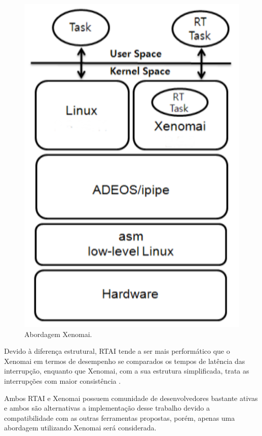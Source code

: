 \documentclass[conference]{IEEEtran}
\begin{document}
\begin{figure}[h]
	\centering
	\includegraphics[scale=0.22]{files/xenomai.png}
	\caption{Abordagem Xenomai.}
	\label{fig:xenomai}
\end{figure}

Devido à diferença estrutural, RTAI tende a ser mais performático que o Xenomai em termos de desempenho se comparados os tempos de latência das interrupção, enquanto que Xenomai, com a sua estrutura simplificada, trata as interrupções com maior consistência \cite{Barbalace_rtai_xenomai}.

Ambos RTAI e Xenomai possuem comunidade de desenvolvedores bastante ativas e ambos são alternativas a implementação desse trabalho devido a compatibilidade com as outras ferramentas propostas, porém, apenas uma abordagem utilizando Xenomai será considerada. 
\end{document}
